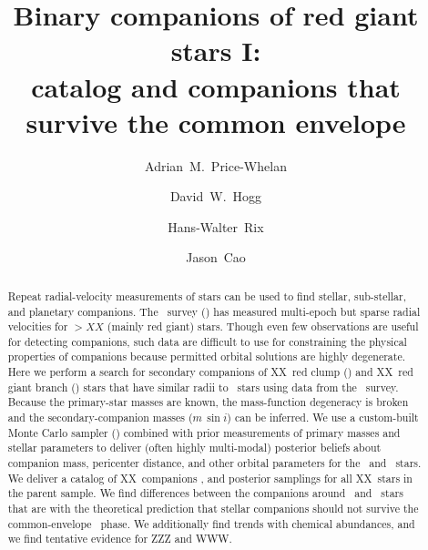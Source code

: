 \documentclass[modern, letterpaper]{aastex61}
\newcommand{\apogee}{\project{\acronym{APOGEE}}}
\newcommand{\thejoker}{\project{The~Joker}}
\newcommand{\DR}{\acronym{DR13}}
\newcommand{\RC}{\acronym{RC}}
\newcommand{\RGB}{\acronym{RGB}}
\newcommand{\nRC}{XX}
\newcommand{\nRGB}{XX}
\newcommand{\ntotal}{XX}
\newcommand{\ncompanions}{XX}
\begin{document}
\sloppy\sloppypar\raggedbottom\frenchspacing %

\title{Binary companions of red giant stars I: \\
       catalog and companions that survive the common envelope}

\author[0000-0003-0872-7098]{Adrian~M.~Price-Whelan}

\author[0000-0003-2866-9403]{David~W.~Hogg}

\author{Hans-Walter~Rix}

\author{Jason~Cao}

\begin{abstract}\noindent %
Repeat radial-velocity measurements of stars can be used to find stellar,
sub-stellar, and planetary companions.
The \apogee\ survey (\DR) has measured multi-epoch but sparse radial velocities
for $> XX$ (mainly red giant) stars.
Though even few observations are useful for detecting companions, such data are
difficult to use for constraining the physical properties of companions because
permitted orbital solutions are highly degenerate.
Here we perform a search for secondary companions of \nRC\ red clump (\RC) and
\nRGB\ red giant branch (\RGB) stars that have similar radii to \RC\ stars
using data from the \apogee\ survey.
Because the primary-star masses are known, the mass-function degeneracy is
broken and the secondary-companion masses ($m\,\sin i$) can be inferred.
We use a custom-built Monte Carlo sampler (\thejoker) combined with prior
measurements of primary masses and stellar parameters to deliver (often highly
multi-modal) posterior beliefs about companion mass, pericenter distance, and
other orbital parameters for the \RC\ and \RGB\ stars.
We deliver a catalog of \ncompanions\ companions ,
and posterior samplings for all \ntotal\ stars in the parent sample.
We find  differences between the companions around \RC\ and \RGB\
stars that are  with the theoretical prediction that
stellar companions should not survive the common-envelope \RGB\ phase.
We additionally find trends with chemical abundances, and we find tentative
evidence for ZZZ and WWW.
\end{abstract}
\end{document}
